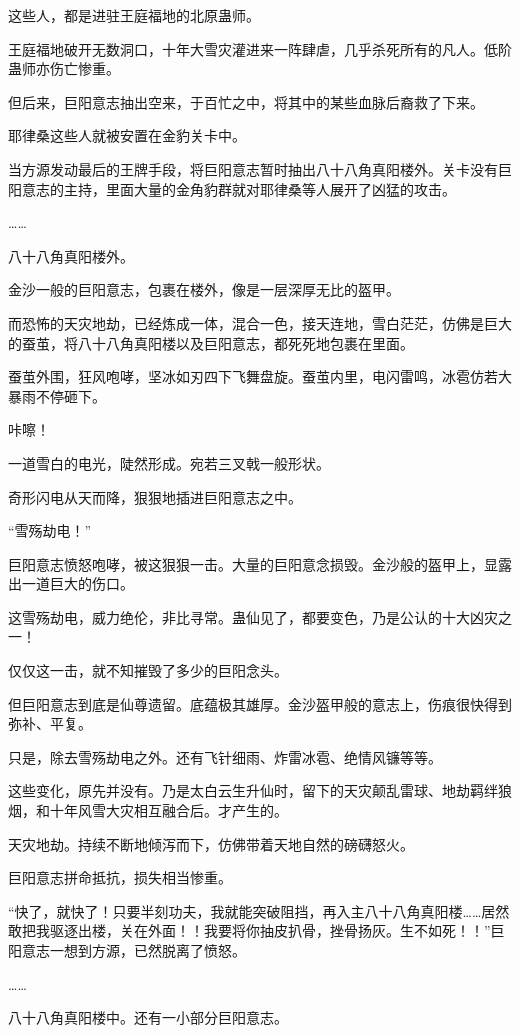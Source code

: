 \begin{this_body}
这些人，都是进驻王庭福地的北原蛊师。

王庭福地破开无数洞口，十年大雪灾灌进来一阵肆虐，几乎杀死所有的凡人。低阶蛊师亦伤亡惨重。

但后来，巨阳意志抽出空来，于百忙之中，将其中的某些血脉后裔救了下来。

耶律桑这些人就被安置在金豹关卡中。

当方源发动最后的王牌手段，将巨阳意志暂时抽出八十八角真阳楼外。关卡没有巨阳意志的主持，里面大量的金角豹群就对耶律桑等人展开了凶猛的攻击。

……

八十八角真阳楼外。

金沙一般的巨阳意志，包裹在楼外，像是一层深厚无比的盔甲。

而恐怖的天灾地劫，已经炼成一体，混合一色，接天连地，雪白茫茫，仿佛是巨大的蚕茧，将八十八角真阳楼以及巨阳意志，都死死地包裹在里面。

蚕茧外围，狂风咆哮，坚冰如刃四下飞舞盘旋。蚕茧内里，电闪雷鸣，冰雹仿若大暴雨不停砸下。

咔嚓！

一道雪白的电光，陡然形成。宛若三叉戟一般形状。

奇形闪电从天而降，狠狠地插进巨阳意志之中。

“雪殇劫电！”

巨阳意志愤怒咆哮，被这狠狠一击。大量的巨阳意念损毁。金沙般的盔甲上，显露出一道巨大的伤口。

这雪殇劫电，威力绝伦，非比寻常。蛊仙见了，都要变色，乃是公认的十大凶灾之一！

仅仅这一击，就不知摧毁了多少的巨阳念头。

但巨阳意志到底是仙尊遗留。底蕴极其雄厚。金沙盔甲般的意志上，伤痕很快得到弥补、平复。

只是，除去雪殇劫电之外。还有飞针细雨、炸雷冰雹、绝情风镰等等。

这些变化，原先并没有。乃是太白云生升仙时，留下的天灾颠乱雷球、地劫羁绊狼烟，和十年风雪大灾相互融合后。才产生的。

天灾地劫。持续不断地倾泻而下，仿佛带着天地自然的磅礴怒火。

巨阳意志拼命抵抗，损失相当惨重。

“快了，就快了！只要半刻功夫，我就能突破阻挡，再入主八十八角真阳楼……居然敢把我驱逐出楼，关在外面！！我要将你抽皮扒骨，挫骨扬灰。生不如死！！”巨阳意志一想到方源，已然脱离了愤怒。

……

八十八角真阳楼中。还有一小部分巨阳意志。


\end{this_body}
